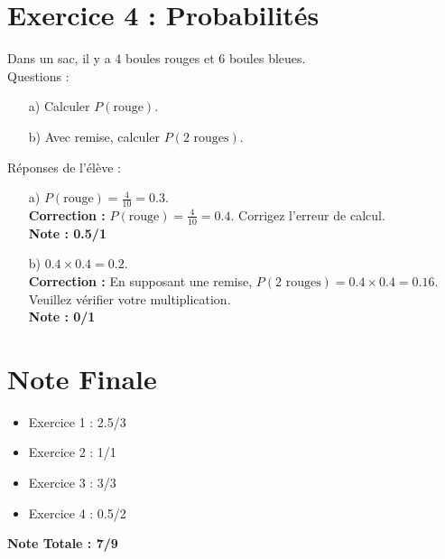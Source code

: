 \documentclass{article}
\begin{document}
\section*{Exercice 4 : Probabilités}
Dans un sac, il y a 4 boules rouges et 6 boules bleues. \\
Questions :
\begin{enumerate}
    \item[a)] Calculer $P(\text{rouge})$.
    \item[b)] Avec remise, calculer $P(2 \text{ rouges})$.
\end{enumerate}
Réponses de l’élève :
\begin{enumerate}
    \item[a)] $P(\text{rouge}) = \frac{4}{10} = 0.3$. \\
    \textbf{Correction :} $P(\text{rouge}) = \frac{4}{10} = 0.4$. Corrigez l'erreur de calcul.\\
    \textbf{Note : 0.5/1}
    
    \item[b)] $0.4 \times 0.4 = 0.2$. \\
    \textbf{Correction :} En supposant une remise, $P(2 \text{ rouges}) = 0.4 \times 0.4 = 0.16$. Veuillez vérifier votre multiplication. \\
    \textbf{Note : 0/1}
\end{enumerate}

\section*{Note Finale}
\begin{itemize}
    \item Exercice 1 : 2.5/3
    \item Exercice 2 : 1/1
    \item Exercice 3 : 3/3
    \item Exercice 4 : 0.5/2
\end{itemize}
\textbf{Note Totale : 7/9}
\end{document}
